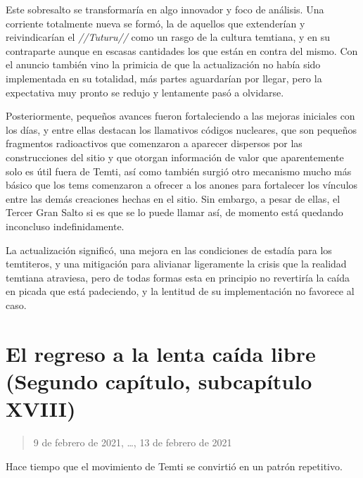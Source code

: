 \documentclass[
  spanish,
]{book}
\begin{document}
Este sobresalto se transformaría en algo innovador y foco de análisis. Una corriente totalmente nueva se formó, la de aquellos que extenderían y reivindicarían el \emph{//Tuturu//} como un rasgo de la cultura temtiana, y en su contraparte aunque en escasas cantidades los que están en contra del mismo. Con el anuncio también vino la primicia de que la actualización no había sido implementada en su totalidad, más partes aguardarían por llegar, pero la expectativa muy pronto se redujo y lentamente pasó a olvidarse.

Posteriormente, pequeños avances fueron fortaleciendo a las mejoras iniciales con los días, y entre ellas destacan los llamativos códigos nucleares, que son pequeños fragmentos radioactivos que comenzaron a aparecer dispersos por las construcciones del sitio y que otorgan información de valor que aparentemente solo es útil fuera de Temti, así como también surgió otro mecanismo mucho más básico que los tems comenzaron a ofrecer a los anones para fortalecer los vínculos entre las demás creaciones hechas en el sitio. Sin embargo, a pesar de ellas, el Tercer Gran Salto si es que se lo puede llamar así, de momento está quedando inconcluso indefinidamente.

La actualización significó, una mejora en las condiciones de estadía para los temtiteros, y una mitigación para alivianar ligeramente la crisis que la realidad temtiana atraviesa, pero de todas formas esta en principio no revertiría la caída en picada que está padeciendo, y la lentitud de su implementación no favorece al caso.

\hypertarget{el-regreso-a-la-lenta-cauxedda-libre-segundo-capuxedtulo-subcapuxedtulo-xviii}{%
\section{El regreso a la lenta caída libre (Segundo capítulo, subcapítulo XVIII)}\label{el-regreso-a-la-lenta-cauxedda-libre-segundo-capuxedtulo-subcapuxedtulo-xviii}}

\begin{quote}
9 de febrero de 2021, \ldots, 13 de febrero de 2021
\end{quote}

Hace tiempo que el movimiento de Temti se convirtió en un patrón repetitivo.
\end{document}
